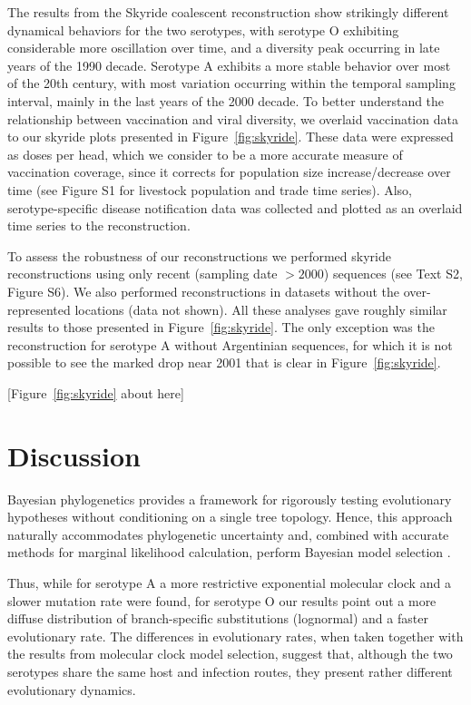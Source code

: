\documentclass[10pt]{article}
\begin{document}
The results from the Skyride coalescent reconstruction show strikingly different dynamical behaviors for the two serotypes, with serotype O exhibiting considerable more oscillation over time, and a diversity peak occurring in late years of the 1990 decade.
Serotype A exhibits a more stable behavior over most of the 20th century, with most variation occurring within the temporal sampling interval, mainly in the last years of the 2000 decade.
To better understand the relationship between vaccination and viral diversity, we overlaid vaccination data to our skyride plots presented in Figure~\ref{fig:skyride}.
These data were expressed as doses per head, which we consider to be a more accurate measure of vaccination coverage, since it corrects for population size increase/decrease over time (see Figure S1 for livestock population and trade time series). %
Also, serotype-specific disease notification data was collected and plotted as an overlaid time series to the reconstruction. 

To assess the robustness of our reconstructions we performed skyride reconstructions using only recent (sampling date $>2000$) sequences (see Text S2, Figure S6).
We also performed reconstructions in datasets without the over-represented locations (data not shown). All these analyses gave roughly similar results to those presented in Figure~\ref{fig:skyride}. The only exception was the reconstruction for serotype A without Argentinian sequences, for which it is not possible to see the marked drop near 2001 that is clear in Figure~\ref{fig:skyride}. 

\begin{center}
 [Figure~\ref{fig:skyride} about here]
\end{center}

\section*{Discussion}
Bayesian phylogenetics provides a framework for rigorously testing evolutionary hypotheses without conditioning on a single tree topology. Hence, this approach naturally accommodates phylogenetic uncertainty and, combined with accurate methods for marginal likelihood calculation, perform Bayesian model selection \cite{Baele2012,Baele2013a,Baele2013b}.

Thus, while for serotype A a more restrictive exponential molecular clock and a slower mutation rate were found, for serotype O our results point out a more diffuse distribution of branch-specific substitutions (lognormal) and a faster evolutionary rate.
The differences in evolutionary rates, when taken together with the results from molecular clock model selection, suggest that, although the two serotypes share the same host and infection routes, they present rather different evolutionary dynamics. 
\end{document}
